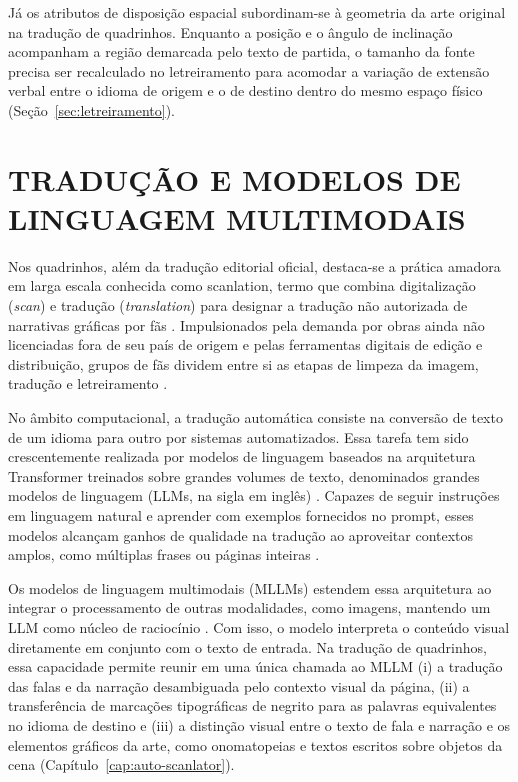 \documentclass[
    12pt,
    openright,
    oneside,
    a4paper,
    chapter=TITLE,
    section=TITLE,
    english,
    brazilian,
    brazil
]{abntex2}
\begin{document}
Já os atributos de disposição espacial subordinam-se à geometria da arte original na tradução de quadrinhos. Enquanto a posição e o ângulo de inclinação acompanham a região demarcada pelo texto de partida, o tamanho da fonte precisa ser recalculado no letreiramento para acomodar a variação de extensão verbal entre o idioma de origem e o de destino dentro do mesmo espaço físico (Seção~\ref{sec:letreiramento}).

\section{TRADUÇÃO E MODELOS DE LINGUAGEM MULTIMODAIS}
\label{sec:traducao}
\label{sec:mllm}

Nos quadrinhos, além da tradução editorial oficial, destaca-se a prática amadora em larga escala conhecida como scanlation, termo que combina digitalização (\textit{scan}) e tradução (\textit{translation}) para designar a tradução não autorizada de narrativas gráficas por fãs \cite{fabbretti2016use}. Impulsionados pela demanda por obras ainda não licenciadas fora de seu país de origem e pelas ferramentas digitais de edição e distribuição, grupos de fãs dividem entre si as etapas de limpeza da imagem, tradução e letreiramento \cite{lee2009between}.

No âmbito computacional, a tradução automática consiste na conversão de texto de um idioma para outro por sistemas automatizados. Essa tarefa tem sido crescentemente realizada por modelos de linguagem baseados na arquitetura Transformer \cite{vaswani2023attentionneed} treinados sobre grandes volumes de texto, denominados grandes modelos de linguagem (LLMs, na sigla em inglês) \cite{zhao2026surveylargelanguagemodels}. Capazes de seguir instruções em linguagem natural e aprender com exemplos fornecidos no prompt, esses modelos alcançam ganhos de qualidade na tradução ao aproveitar contextos amplos, como múltiplas frases ou páginas inteiras \cite{Gain_2026}.

Os modelos de linguagem multimodais (MLLMs) estendem essa arquitetura ao integrar o processamento de outras modalidades, como imagens, mantendo um LLM como núcleo de raciocínio \cite{Yin_2024}. Com isso, o modelo interpreta o conteúdo visual diretamente em conjunto com o texto de entrada. Na tradução de quadrinhos, essa capacidade permite reunir em uma única chamada ao MLLM (i) a tradução das falas e da narração desambiguada pelo contexto visual da página, (ii) a transferência de marcações tipográficas de negrito para as palavras equivalentes no idioma de destino e (iii) a distinção visual entre o texto de fala e narração e os elementos gráficos da arte, como onomatopeias e textos escritos sobre objetos da cena (Capítulo~\ref{cap:auto-scanlator}).
\end{document}

